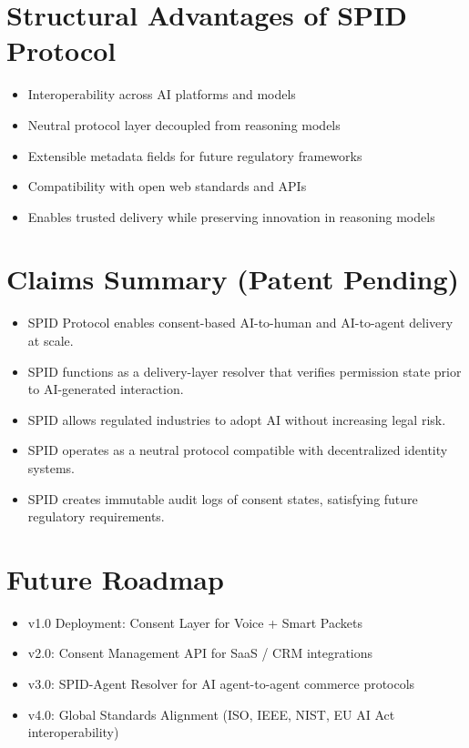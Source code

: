 \documentclass[conference]{IEEEtran}
\begin{document}
\section{Structural Advantages of SPID Protocol}

\begin{itemize}
    \item Interoperability across AI platforms and models
    \item Neutral protocol layer decoupled from reasoning models
    \item Extensible metadata fields for future regulatory frameworks
    \item Compatibility with open web standards and APIs
    \item Enables trusted delivery while preserving innovation in reasoning models
\end{itemize}

\section{Claims Summary (Patent Pending)}

\begin{itemize}
    \item SPID Protocol enables consent-based AI-to-human and AI-to-agent delivery at scale.
    \item SPID functions as a delivery-layer resolver that verifies permission state prior to AI-generated interaction.
    \item SPID allows regulated industries to adopt AI without increasing legal risk.
    \item SPID operates as a neutral protocol compatible with decentralized identity systems.
    \item SPID creates immutable audit logs of consent states, satisfying future regulatory requirements.
\end{itemize}

\section{Future Roadmap}

\begin{itemize}
    \item v1.0 Deployment: Consent Layer for Voice + Smart Packets
    \item v2.0: Consent Management API for SaaS / CRM integrations
    \item v3.0: SPID-Agent Resolver for AI agent-to-agent commerce protocols
    \item v4.0: Global Standards Alignment (ISO, IEEE, NIST, EU AI Act interoperability)
\end{itemize}
\end{document}
